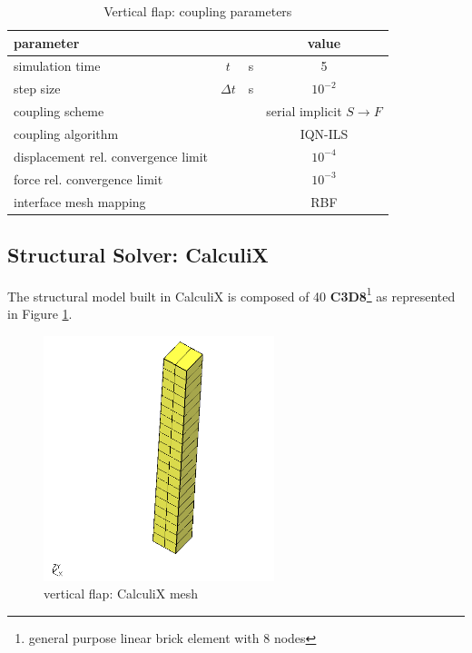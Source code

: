 \begin{table}[!h]
	\begin{center}
		\begin{tabular}{ l c  l| c } 
			parameter & & & value   \\ 
			\hline
			simulation time  & $t$& \si{s} & 5      \\
			step size & $\Delta t$ & \si{s} & $10^{-2}$   \\
			\hline
			coupling scheme & & & serial implicit  $S\rightarrow F$  \\
			coupling algorithm & & &  IQN-ILS  \\
			displacement rel. convergence limit & & & $10^{-4}$ \\
			force rel. convergence limit &&  & $10^{-3}$  \\
      		interface mesh mapping & & & RBF  \\
			
		\end{tabular}
	\end{center}
	\caption{Vertical flap: coupling parameters}
	\label{table:ex1-coupling}
\end{table}





\subsection{Structural Solver: CalculiX}

The structural model built in CalculiX is composed of 40 \textbf{C3D8}\footnote{general purpose linear brick element with 8 nodes} as represented in Figure \ref{fig:cx-mesh}. 

\begin{figure}[htbp!]
	\centering
	\includegraphics[width=0.6\textwidth]{images/cx1}
	\caption{vertical flap: CalculiX mesh}
	\label{fig:cx-mesh}
\end{figure}

